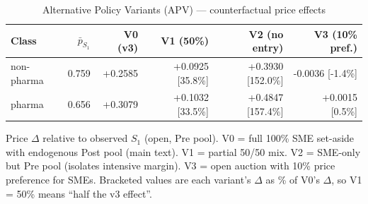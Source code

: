 \begin{table}[htbp]
\centering
\begin{threeparttable}
\caption{Alternative Policy Variants (APV) — counterfactual price effects}
\label{tab:v3_apv}
\small
\begin{tabular}{lrrrrr}
\toprule
Class & $\bar p_{S_1}$ & V0 (v3) & V1 (50\%) & V2 (no entry) & V3 (10\% pref.) \\
\midrule
non-pharma & 0.759 & +0.2585 & +0.0925 [35.8\%] & +0.3930 [152.0\%] & -0.0036 [-1.4\%] \\
pharma & 0.656 & +0.3079 & +0.1032 [33.5\%] & +0.4847 [157.4\%] & +0.0015 [0.5\%] \\
\bottomrule
\end{tabular}
\begin{tablenotes}\footnotesize
\item Price $\Delta$ relative to observed $S_1$ (open, Pre pool).
V0 = full 100\% SME set-aside with endogenous Post pool (main text).
V1 = partial 50/50 mix. V2 = SME-only but Pre pool (isolates intensive
margin). V3 = open auction with 10\% price preference for SMEs.
Bracketed values are each variant's $\Delta$ as \% of V0's $\Delta$,
so V1 = 50\% means ``half the v3 effect''.
\end{tablenotes}
\end{threeparttable}
\end{table}
